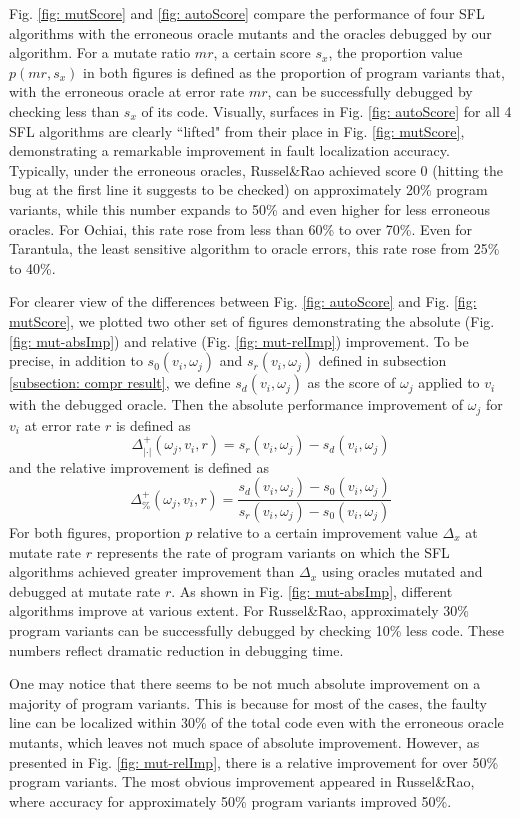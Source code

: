 Fig. \ref{fig: mutScore} and \ref{fig: autoScore} compare the performance of four SFL algorithms with the erroneous oracle mutants and the oracles debugged by our algorithm. For a mutate ratio $mr$, a certain score $s_x$, the proportion value $p(mr, s_x)$ in both figures is defined as the proportion of program variants that, with the erroneous oracle at error rate $mr$, can be successfully debugged by checking less than $s_x$ of its code.
Visually, surfaces in Fig. \ref{fig: autoScore} for all 4 SFL algorithms are clearly ``lifted" from their place in Fig. \ref{fig: mutScore}, demonstrating a remarkable improvement in fault localization accuracy. Typically, under the erroneous oracles, Russel\&Rao achieved score $0$ (hitting the bug at the first line it suggests to be checked) on approximately 20\% program variants, while this number expands to 50\% and even higher for less erroneous oracles. For Ochiai, this rate rose from less than 60\% to over 70\%. Even for Tarantula, the least sensitive algorithm to oracle errors, this rate rose from 25\% to 40\%.

For clearer view of the differences between Fig. \ref{fig: autoScore} and Fig. \ref{fig: mutScore}, we plotted two other set of figures demonstrating the absolute (Fig. \ref{fig: mut-absImp}) and relative (Fig. \ref{fig: mut-relImp}) improvement. To be precise, in addition to  $s_0(v_i, \omega_j)$ and $s_r(v_i, \omega_j)$ defined in subsection \ref{subsection: compr result}, we define $s_d(v_i, \omega_j)$ as the score of $\omega_j$ applied to $v_i$ with the debugged oracle. Then the absolute performance improvement of $\omega_j$ for $v_i$ at error rate $r$ is defined as
$$
\Delta_{|\cdot|}^{+}(\omega_j, v_i, r) = s_r(v_i, \omega_j) - s_d(v_i, \omega_j)
$$
and the relative improvement is defined as
$$
\Delta_{\%}^{+}(\omega_j, v_i, r) = \frac{s_d(v_i, \omega_j) - s_0(v_i, \omega_j)}{s_r(v_i, \omega_j) - s_0(v_i, \omega_j)}
$$
For both figures, proportion $p$ relative to a certain improvement value $\Delta_x$ at mutate rate $r$ represents the rate of program variants on which the SFL algorithms achieved greater improvement than $\Delta_x$ using oracles mutated and debugged at mutate rate $r$. As shown in Fig. \ref{fig: mut-absImp}, different algorithms improve at various extent. For Russel\&Rao, approximately 30\% program variants can be successfully debugged by checking 10\% less code. These numbers reflect dramatic reduction in debugging time.

One may notice that there seems to be not much absolute improvement on a majority of program variants. This is because for most of the cases, the faulty line can be localized within 30\% of the total code even with the erroneous oracle mutants, which leaves not much space of absolute improvement. However, as presented in Fig. \ref{fig: mut-relImp}, there is a relative improvement for over 50\% program variants. The most obvious improvement appeared in Russel\&Rao, where accuracy for approximately 50\% program variants improved 50\%.

